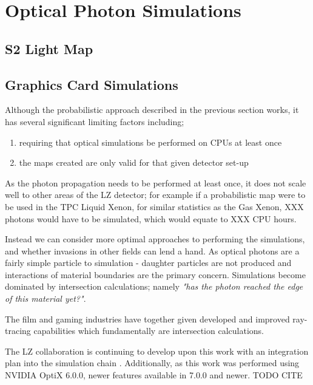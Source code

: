 \section{Optical Photon Simulations}

\subsection{S2 Light Map}

\subsection{Graphics Card Simulations}

\par
Although the probabilistic approach described in the previous section works, it has several significant limiting factors including;
\begin{enumerate}
    \item requiring that optical simulations be performed on CPUs at least once
    \item the maps created are only valid for that given detector set-up 
\end{enumerate}
As the photon propagation needs to be performed at least once, it does not scale well to other areas of the LZ detector; for example if a probabilistic map were to be used in the TPC Liquid Xenon, for similar statistics as the Gas Xenon, XXX photons would have to be simulated, which would equate to XXX CPU hours. 

\par
Instead we can consider more optimal approaches to performing the simulations, and whether invasions in other fields can lend a hand.
As optical photons are a fairly simple particle to simulation - daughter particles are not produced and interactions of material boundaries are the primary concern.
Simulations become dominated by intersection calculations; namely \textit{"has the photon reached the edge of this material yet?"}.

\par
The film and gaming industries have together given developed and improved ray-tracing capabilities which fundamentally are intersection calculations.



\par
The LZ collaboration is continuing to develop upon this work with an integration plan into the simulation chain \cite{SEriksen_Opticks_CHEP_2021_ref}.
Additionally, as this work was performed using NVIDIA OptiX 6.0.0, newer features available in 7.0.0 and newer. TODO CITE
